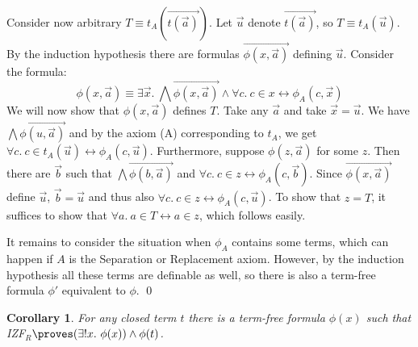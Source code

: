 \documentclass{LMCS}
\newtheorem{corollary}[thm]{Corollary}
\newcommand\iffl{\ensuremath{\leftrightarrow}}
\newcommand{\ignore}[1]{}
\newcommand{\p}{\proves}
\newcommand{\izfr}{IZF${}_R$}
\begin{document}
Consider now arbitrary $T \equiv t_A(\overrightarrow{t(\vec{a})})$. Let
$\vec{u}$ denote $\overrightarrow{t(\vec{a})}$, so $T \equiv t_A(\vec{u})$.
By the induction hypothesis there are formulas $\overrightarrow{\phi(x,
\vec{a})}$ defining $\vec{u}$. Consider the formula:
\[
\phi(x, \vec{a}) \equiv \exists \vec{x}.\ \bigwedge \overrightarrow{\phi(x,
\vec{a})} \land \forall c.\ c \in x \iffl \phi_A(c, \vec{x})
\]
We will now show that $\phi(x, \vec{a})$ defines $T$. Take any $\vec{a}$ and take 
$\vec{x} = \vec{u}$. We have
$\bigwedge \overrightarrow{\phi(u, \vec{a})}$ and
by the axiom (A) corresponding to $t_A$, we get $\forall c.\ c \in
t_A(\vec{u}) \iffl \phi_A(c, \vec{u})$. Furthermore, suppose $\phi(z, \vec{a})$ for
some $z$. Then there are $\vec{b}$ such that $\bigwedge
\overrightarrow{\phi(b, \vec{a})}$ and $\forall c.\
c \in z \iffl \phi_A(c, \vec{b})$. Since $\overrightarrow{\phi(x, \vec{a})}$ define $\vec{u}$,
$\vec{b} = \vec{u}$ and thus also $\forall c.\ c \in z \iffl \phi_A(c, \vec{u})$.
To show that $z = T$, it suffices to show that $\forall a.\ a \in T \iffl a \in z$, which follows easily.

It remains to consider the situation when $\phi_A$ contains some terms,
which can happen if $A$ is the Separation or Replacement axiom. However, by the 
induction hypothesis all these terms are definable as well, so there is also a term-free formula $\phi'$ equivalent to $\phi$.
\ignore{
\[
\phi(x, \vec{a}) \equiv \exists \vec{x}.\ \bigwedge \overrightarrow{\phi(x,
\vec{a})} \land \forall c.\ c \in x \iffl \phi_A(c, \vec{x})
\]
Let the formulas
$\overrightarrow{\phi(x, \vec{a})}$ define $\overrightarrow{u(\vec{a})}$.
defines $t$. To see that $\phi(t)$ holds, take $\vec{x} = \vec{u}$.
By the induction hypothesis we have $\bigwedge \overrightarrow{\phi(u)}$ and 
by the axiom (A) defining $t_A$, we get $\forall c.\ c \in
t_A(\vec{u}) \iffl \phi_A(c, \vec{u})$. Furthermore, suppose $\phi(z)$ for
some $z$. Then there are $\vec{b}$ such that $\bigwedge \overrightarrow{\phi(b)}$ and $\forall c.\
c \in z \iffl \phi_A(c, \vec{b})$. Since $\overrightarrow{\phi(x)}$ define $\vec{u}$,
$\vec{b} = \vec{u}$ and thus also $\forall c.\ c \in z \iffl \phi_A(c, \vec{u})$. 
To show that $z = t$, it suffices to show that $\forall a.\ a \in t \iffl a
\in z$, which follows easily.}\qed


\begin{corollary}\label{tdef}
For any closed term $t$ there is a term-free formula $\phi(x)$ such that \izfr $\p 
(\exists !x.\ \phi(x)) \land \phi(t)$.
\end{corollary}
\end{document}
